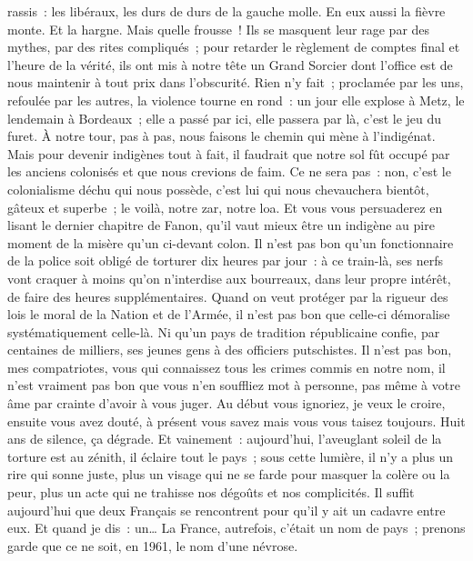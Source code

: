 \documentclass[french,twoside]{book} %
\begin{document}
rassis : les libéraux, les durs de durs de la gauche molle. En eux aussi la fièvre monte. Et la hargne. Mais quelle frousse ! Ils se masquent leur rage par des mythes, par des rites compliqués ; pour retarder le règlement de comptes final et l’heure de la vérité, ils ont mis à notre tête un Grand Sorcier dont l’office est de nous maintenir à tout prix dans l’obscurité. Rien n’y fait ; proclamée par les uns, refoulée par les autres, la violence tourne en rond : un jour elle explose à Metz, le lendemain à Bordeaux ; elle a passé par ici, elle passera par là, c’est le jeu du furet. À notre tour, pas à pas, nous faisons le chemin qui mène à l’indigénat. Mais pour devenir indigènes tout à fait, il faudrait que notre sol fût occupé par les anciens colonisés et que nous crevions de faim. Ce ne sera pas : non, c’est le colonialisme déchu qui nous possède, c’est lui qui nous chevauchera bientôt, gâteux et superbe ; le voilà, notre zar, notre loa. Et vous vous persuaderez en lisant le dernier chapitre de Fanon, qu’il vaut mieux être un indigène au pire moment de la misère qu’un ci-devant colon. Il n’est pas bon qu’un fonctionnaire de la police soit obligé de torturer dix heures par jour : à ce train-là, ses nerfs vont craquer à moins qu’on n’interdise aux bourreaux, dans leur propre intérêt, de faire des heures supplémentaires. Quand on veut protéger par la rigueur des lois le moral de la Nation et de l’Armée, il n’est pas bon que celle-ci démoralise systématiquement celle-là. Ni qu’un pays de tradition républicaine confie, par centaines de milliers, ses jeunes gens à des officiers putschistes. Il n’est pas bon, mes compatriotes, vous qui connaissez tous les crimes commis en notre nom, il n’est vraiment pas bon que vous n’en souffliez mot à personne, pas même à votre âme par crainte d’avoir à vous juger. Au début vous ignoriez, je veux le croire, ensuite vous avez douté, à présent vous savez mais vous vous   taisez toujours. Huit ans de silence, ça dégrade. Et vainement : aujourd’hui, l’aveuglant soleil de la torture est au zénith, il éclaire tout le pays ; sous cette lumière, il n’y a plus un rire qui sonne juste, plus un visage qui ne se farde pour masquer la colère ou la peur, plus un acte qui ne trahisse nos dégoûts et nos complicités. Il suffit aujourd’hui que deux Français se rencontrent pour qu’il y ait un cadavre entre eux. Et quand je dis : un… La France, autrefois, c’était un nom de pays ; prenons garde que ce ne soit, en 1961, le nom d’une névrose.\par
\end{document}
